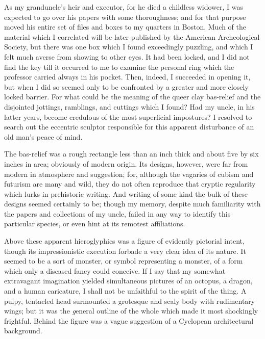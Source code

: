 As my granduncle’s heir and executor, for he died a childless widower, I was expected to go over his papers with some thoroughness; and for that purpose moved his entire set of files and boxes to my quarters in Boston. Much of the material which I correlated will be later published by the American Archeological Society, but there was one box which I found exceedingly puzzling, and which I felt much averse from showing to other eyes. It had been locked, and I did not find the key till it occurred to me to examine the personal ring which the professor carried always in his pocket. Then, indeed, I succeeded in opening it, but when I did so seemed only to be confronted by a greater and more closely locked barrier. For what could be the meaning of the queer clay bas-relief and the disjointed jottings, ramblings, and cuttings which I found? Had my uncle, in his latter years, become credulous of the most superficial impostures? I resolved to search out the eccentric sculptor responsible for this apparent disturbance of an old man’s peace of mind.

The bas-relief was a rough rectangle less than an inch thick and about five by six inches in area; obviously of modern origin. Its designs, however, were far from modern in atmosphere and suggestion; for, although the vagaries of cubism and futurism are many and wild, they do not often reproduce that cryptic regularity which lurks in prehistoric writing. And writing of some kind the bulk of these designs seemed certainly to be; though my memory, despite much familiarity with the papers and collections of my uncle, failed in any way to identify this particular species, or even hint at its remotest affiliations.

Above these apparent hieroglyphics was a figure of evidently pictorial intent, though its impressionistic execution forbade a very clear idea of its nature. It seemed to be a sort of monster, or symbol representing a monster, of a form which only a diseased fancy could conceive. If I say that my somewhat extravagant imagination yielded simultaneous pictures of an octopus, a dragon, and a human caricature, I shall not be unfaithful to the spirit of the thing. A pulpy, tentacled head surmounted a grotesque and scaly body with rudimentary wings; but it was the {\emph general outline} of the whole which made it most shockingly frightful. Behind the figure was a vague suggestion of a Cyclopean architectural background.


